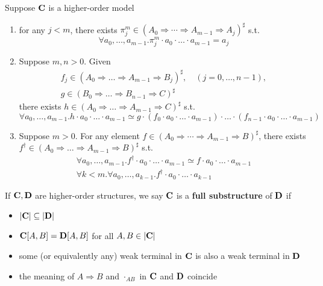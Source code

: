 \documentclass[11pt]{article}
\begin{document}
\begin{proposition}[]
\label{3.1.14}
Suppose \(\operatorname{\textbf{C}}\) is a higher-order model
\begin{enumerate}
\item for any \(j<m\), there exists \(\pi_j^m\in(A_0\Rightarrow\cdots\Rightarrow A_{m-1}\Rightarrow A_j)^\sharp\) s.t.
\begin{equation*}
\forall a_0,\dots,a_{m-1}.\pi_j^m\cdot a_0\cdot\dots\cdot a_{m-1}=a_j
\end{equation*}
\item Suppose \(m,n>0\). Given
\begin{gather*}
f_j\in(A_0\Rightarrow\dots\Rightarrow A_{m-1}\Rightarrow B_j)^\sharp,\quad(j=0,\dots,n-1),\\
g\in(B_0\Rightarrow\dots\Rightarrow B_{n-1}\Rightarrow C)^\sharp
\end{gather*}
there exists \(h\in (A_0\Rightarrow\dots\Rightarrow A_{m-1}\Rightarrow C)^\sharp\) s.t.
\begin{equation*}
\forall a_0,\dots,a_{m-1}.h\cdot a_0\cdot\dots\cdot a_{m-1}\simeq g\cdot(f_0\cdot a_0\cdot\dots\cdot a_{m-1})\cdot\dots\cdot(f_{n-1}\cdot a_0\cdot\dots\cdot a_{m-1})
\end{equation*}
\item Suppose \(m>0\). For any element \(f\in (A_0\Rightarrow\cdots\Rightarrow A_{m-1}\Rightarrow B)^\sharp\), there
exists \(f^\dagger\in(A_0\Rightarrow\dots\Rightarrow A_{m-1}\Rightarrow B)^\sharp\) s.t.
\begin{gather*}
\forall a_0,\dots,a_{m-1}.f^\dagger\cdot a_0\cdot\dots\cdot a_{m-1}\simeq f\cdot a_0\cdot\dots\cdot a_{m-1}\\
\forall k<m.\forall a_0,\dots,a_{k-1}.f^\dagger\cdot a_0\cdot\dots\cdot a_{k-1}
\end{gather*}
\end{enumerate}
\end{proposition}

If \(\operatorname{\textbf{C}},\operatorname{\textbf{D}}\) are higher-order structures, we say \(\operatorname{\textbf{C}}\) is a \textbf{full substructure} of \(\operatorname{\textbf{D}}\) if
\begin{itemize}
\item \(\abs{\bC}\subseteq\abs{\bD}\)
\item \(\operatorname{\textbf{C}}[A,B]=\operatorname{\textbf{D}}[A,B]\) for all \(A,B\in\abs{\bC}\)
\item some (or equivalently any) weak terminal in \(\operatorname{\textbf{C}}\) is also a weak terminal in \(\operatorname{\textbf{D}}\)
\item the meaning of \(A\Rightarrow B\) and \(\cdot_{AB}\) in \(\operatorname{\textbf{C}}\) and \(\operatorname{\textbf{D}}\) coincide
\end{itemize}
\end{document}
